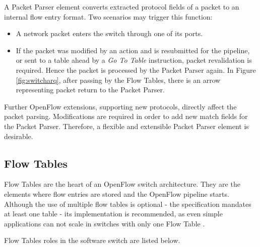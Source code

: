 	A Packet Parser element converts extracted protocol fields of a packet to an internal flow entry format. Two scenarios may trigger this function:   

	\begin{itemize}

	\item A network packet enters the switch through one of its ports.    

	\item  If the packet was modified by an action and is resubmitted for the pipeline, or sent to a table ahead by a \textit{Go To Table} instruction, packet revalidation is required. Hence the packet is processed by the Packet Parser again. In Figure \ref{fig:switcharq}, after passing by the Flow Tables, there is an arrow representing packet return to the Packet Parser.        

	\end{itemize}

	Further OpenFlow extensions, supporting new protocols, directly affect the packet parsing. Modifications are required in order to add new match fields for the Packet Parser. Therefore, a flexible and extensible Packet Parser element is desirable.  

	\subsection{Flow Tables}

	Flow Tables are the heart of an OpenFlow switch architecture. They are the elements where flow entries are stored and the OpenFlow pipeline starts. Although the use of multiple flow tables is optional - the specification mandates at least one table - its implementation is recommended, as even simple applications can not scale in switches with only one Flow Table \cite{tableExplosion}.  
	
	Flow Tables roles in the software switch are listed below.

